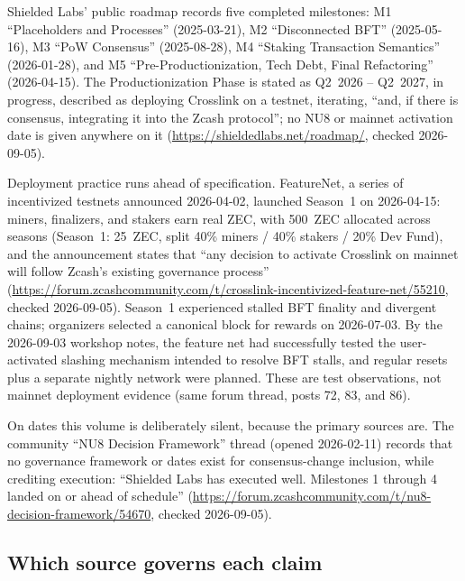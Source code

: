 \documentclass[11pt,a4paper]{article}
\theoremstyle{definition}
\begin{document}
Shielded Labs' public roadmap records five completed milestones: M1
``Placeholders and Processes'' (2025-03-21), M2 ``Disconnected BFT''
(2025-05-16), M3 ``PoW Consensus'' (2025-08-28), M4 ``Staking
Transaction Semantics'' (2026-01-28), and M5 ``Pre-Productionization,
Tech Debt, Final Refactoring'' (2026-04-15). The Productionization Phase
is stated as Q2~2026 -- Q2~2027, in progress, described as deploying
Crosslink on a testnet, iterating, ``and, if there is consensus,
integrating it into the Zcash protocol''; no NU8 or mainnet activation
date is given anywhere on it (\url{https://shieldedlabs.net/roadmap/}, checked
2026-09-05).

Deployment practice runs ahead of specification. FeatureNet, a series of
incentivized testnets announced 2026-04-02, launched Season~1 on
2026-04-15: miners, finalizers, and stakers earn real ZEC, with 500~ZEC
allocated across seasons (Season~1: 25~ZEC, split 40\% miners / 40\%
stakers / 20\% Dev Fund), and the announcement states that ``any
decision to activate Crosslink on mainnet will follow Zcash's existing
governance process''
(\url{https://forum.zcashcommunity.com/t/crosslink-incentivized-feature-net/55210},
checked
2026-09-05). Season~1 experienced stalled BFT finality and divergent
chains; organizers selected a canonical block for rewards on 2026-07-03.
By the 2026-09-03 workshop notes, the feature net had successfully tested
the user-activated slashing mechanism intended to resolve BFT stalls, and
regular resets plus a separate nightly network were planned. These are
test observations, not mainnet deployment evidence (same forum thread,
posts 72, 83, and 86).

On dates this volume is deliberately silent, because the primary sources
are. The community ``NU8 Decision Framework'' thread (opened 2026-02-11)
records that no governance framework or dates exist for
consensus-change inclusion, while crediting execution: ``Shielded Labs
has executed well. Milestones 1 through 4 landed on or ahead of
schedule''
(\url{https://forum.zcashcommunity.com/t/nu8-decision-framework/54670},
checked 2026-09-05).

\subsection{Which source governs each claim}\label{sec:xl-normative}
\end{document}
